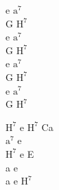 \begin{chord}
    e $\mathrm{a^7}$\\
    G $\mathrm{H^7}$\\
    e $\mathrm{a^7}$\\
    G $\mathrm{H^7}$\\
    e $\mathrm{a^7}$\\
    G $\mathrm{H^7}$\\
    e $\mathrm{a^7}$\\
    G $\mathrm{H^7}$

    $\mathrm{H^7}$ e $\mathrm{H^7}$ Ca\\
    $\mathrm{a^7}$ e\\
    $\mathrm{H^7}$ e E\\
    a e\\
    a e $\mathrm{H^7}$
\end{chord}
